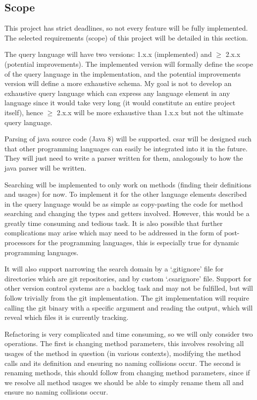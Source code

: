 \documentclass[12pt, letterpaper]{article}
\begin{document}
\subsection{Scope}
This project has strict deadlines, so not every feature will be fully implemented.
The selected requirements (scope) of this project will be detailed in this section.

The query language will have two versions: 1.x.x (implemented) and $ \geq $ 2.x.x (potential improvements).
The implemented version will formally define the scope of the query language in the implementation, and the potential improvements version will define a more exhaustive schema.
My goal is not to develop an exhaustive query language which can express any language element in any language since it would take very long (it would constitute an entire project itself), hence $ \geq $ 2.x.x will be more exhaustive than 1.x.x but not the ultimate query language.

Parsing of java source code (Java 8) will be supported.
csar will be designed such that other programming languages can easily be integrated into it in the future.
They will just need to write a parser written for them, analogously to how the java parser will be written.

Searching will be implemented to only work on methods (finding their definitions and usages) for now.
To implement it for the other language elements described in the query language would be as simple as copy-pasting the code for method searching and changing the types and getters involved.
However, this would be a greatly time consuming and tedious task.
It is also possible that further complications may arise which may need to be addressed in the form of post-processors for the programming languages, this is especially true for dynamic programming languages.

It will also support narrowing the search domain by a `.gitignore' file for directories which are git repositories, and by custom `.csarignore' file. Support for other version control systems are a backlog task and may not be fulfilled, but will follow trivially from the git implementation.
The git implementation will require calling the git binary with a specific argument and reading the output, which will reveal which files it is currently tracking.

Refactoring is very complicated and time consuming, so we will only consider two operations.
The first is changing method parameters, this involves resolving all usages of the method in question (in various contexts), modifying the method calls and its definition and ensuring no naming collisions occur.
The second is renaming methods, this should follow from changing method parameters, since if we resolve all method usages we should be able to simply rename them all and ensure no naming collisions occur.
\end{document}
